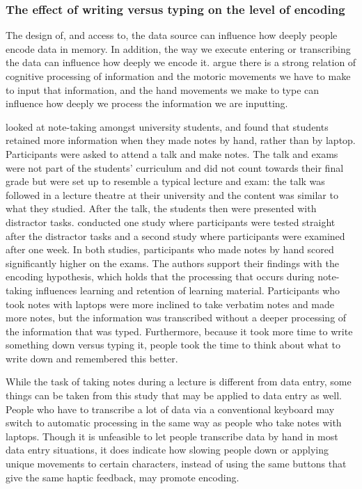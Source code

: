 \documentclass[11pt,oneside]{report}
\begin{document}
\subsubsection{The effect of writing versus typing on the level of encoding}
The design of, and access to, the data source can influence how deeply people encode data in memory. In addition, the way we execute entering or transcribing the data can influence how deeply we encode it. \citet{Mangen2010} argue there is a strong relation of cognitive processing of information and the motoric movements we have to make to input that information, and the hand movements we make to type can influence how deeply we process the information we are inputting. 

\citet{Mueller2014} looked at note-taking amongst university students, and found that students retained more information when they made notes by hand, rather than by laptop. Participants were asked to attend a talk and make notes.
The talk and exams were not part of the students' curriculum and did not count towards their final grade but were set up to resemble a typical lecture and exam: the talk was followed in a lecture theatre at their university and the content was similar to what they studied. 
After the talk, the students then were presented with distractor tasks. 
\citet{Mueller2014} conducted one study where participants were tested straight after the distractor tasks and a second study where participants were examined after one week. 
In both studies, participants who made notes by hand scored significantly higher on the exams. The authors support their findings with the encoding hypothesis, which holds that the processing that occurs during note-taking influences learning and retention of learning material.  Participants who took notes with laptops were more inclined to take verbatim notes and made more notes, but the information was transcribed without a deeper processing of the information that was typed. 
Furthermore, because it took more time to write something down versus typing it, people took the time to think about what to write down and remembered this better.

While the task of taking notes during a lecture is different from data entry, some things can be taken from this study that may be applied to data entry as well. 
People who have to transcribe a lot of data via a conventional keyboard may switch to automatic processing in the same way as people who take notes with laptops. Though it is unfeasible to let people transcribe data by hand in most data entry situations, it does indicate how slowing people down or applying unique movements to certain characters, instead of using the same buttons that give the same haptic feedback, may promote encoding.
\end{document}
